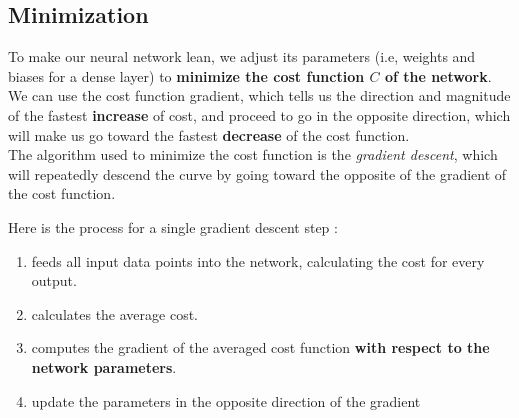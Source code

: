 \documentclass[a4paper, twocolumn, twoside]{article}
\begin{document}
	\subsection{Minimization}
	To make our neural network lean, we adjust its parameters (i.e, weights and biases for a dense layer)
	to \textbf{minimize the cost function $C$ of the network}.
	We can use the cost function gradient, which tells us the direction and magnitude
	of the fastest \textbf{increase} of cost, and proceed to go in the opposite direction,
	which will make us go toward the fastest \textbf{decrease} of the cost function.\\
	The algorithm used to minimize the cost function is the \textit{gradient descent},
	which will repeatedly descend the curve by going toward the opposite of the gradient of the cost function.

	Here is the process for a single gradient descent step :
	\begin{enumerate}
		\item feeds all input data points into the network,
			calculating the cost for every output.
		\item calculates the average cost.
		\item computes the gradient of the averaged cost function \textbf{with respect to the network parameters}.
		\item update the parameters in the opposite direction of the gradient
	\end{enumerate}
\end{document}
